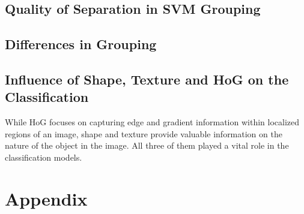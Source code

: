 \documentclass{article}
\begin{document}
\subsection*{Quality of Separation in SVM Grouping}
\subsection*{Differences in Grouping}
\subsection*{Influence of Shape, Texture and HoG on the Classification}
While HoG focuses on capturing edge and gradient information within localized regions of an image, shape and texture provide valuable information on the nature of the object in the image. All three of them played a vital role in the classification models. 
\clearpage

\section*{Appendix} 
\end{document}

